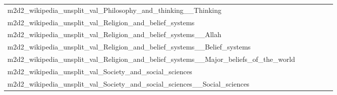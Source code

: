 {\begin{longtable}{m{6cm}m{1.7cm}m{1.7cm}m{1.7cm}m{1.7cm}m{1.7cm}}
	m2d2\_wikipedia\_unsplit\_val\_Philosophy\_and\_thinking\_\_Thinking  & \colorbox[HTML]{fefee2}{\makebox[\mywidth][c]{10.94}} & \colorbox[HTML]{edf8b2}{\makebox[\mywidth][c]{10.61}} & \colorbox[HTML]{ffffe5}{\makebox[\mywidth][c]{11.34}} & \colorbox[HTML]{ddf1a6}{\makebox[\mywidth][c]{10.56}} & \colorbox[HTML]{77c578}{\makebox[\mywidth][c]{10.42}}\\
	m2d2\_wikipedia\_unsplit\_val\_Religion\_and\_belief\_systems  & \colorbox[HTML]{fdfedf}{\makebox[\mywidth][c]{12.81}} & \colorbox[HTML]{f0f9b4}{\makebox[\mywidth][c]{12.45}} & \colorbox[HTML]{ffffe5}{\makebox[\mywidth][c]{13.44}} & \colorbox[HTML]{e0f2a8}{\makebox[\mywidth][c]{12.38}} & \colorbox[HTML]{77c578}{\makebox[\mywidth][c]{12.19}}\\
	m2d2\_wikipedia\_unsplit\_val\_Religion\_and\_belief\_systems\_\_Allah  & \colorbox[HTML]{fdfedf}{\makebox[\mywidth][c]{11.11}} & \colorbox[HTML]{eff8b3}{\makebox[\mywidth][c]{10.80}} & \colorbox[HTML]{ffffe5}{\makebox[\mywidth][c]{11.66}} & \colorbox[HTML]{d3eda0}{\makebox[\mywidth][c]{10.71}} & \colorbox[HTML]{77c578}{\makebox[\mywidth][c]{10.58}}\\
	m2d2\_wikipedia\_unsplit\_val\_Religion\_and\_belief\_systems\_\_Belief\_systems  & \colorbox[HTML]{fefee3}{\makebox[\mywidth][c]{11.46}} & \colorbox[HTML]{f1f9b4}{\makebox[\mywidth][c]{11.06}} & \colorbox[HTML]{ffffe5}{\makebox[\mywidth][c]{11.86}} & \colorbox[HTML]{c9e99b}{\makebox[\mywidth][c]{10.95}} & \colorbox[HTML]{77c578}{\makebox[\mywidth][c]{10.85}}\\
	m2d2\_wikipedia\_unsplit\_val\_Religion\_and\_belief\_systems\_\_Major\_beliefs\_of\_the\_world  & \colorbox[HTML]{fefee0}{\makebox[\mywidth][c]{12.38}} & \colorbox[HTML]{f0f9b4}{\makebox[\mywidth][c]{12.03}} & \colorbox[HTML]{ffffe5}{\makebox[\mywidth][c]{12.94}} & \colorbox[HTML]{cae99c}{\makebox[\mywidth][c]{11.91}} & \colorbox[HTML]{77c578}{\makebox[\mywidth][c]{11.79}}\\
	m2d2\_wikipedia\_unsplit\_val\_Society\_and\_social\_sciences  & \colorbox[HTML]{fdfedf}{\makebox[\mywidth][c]{10.53}} & \colorbox[HTML]{ecf7b1}{\makebox[\mywidth][c]{10.24}} & \colorbox[HTML]{ffffe5}{\makebox[\mywidth][c]{11.03}} & \colorbox[HTML]{d3eda0}{\makebox[\mywidth][c]{10.16}} & \colorbox[HTML]{77c578}{\makebox[\mywidth][c]{10.05}}\\
	m2d2\_wikipedia\_unsplit\_val\_Society\_and\_social\_sciences\_\_Social\_sciences  & \colorbox[HTML]{fdfede}{\makebox[\mywidth][c]{10.47}} & \colorbox[HTML]{d9f0a3}{\makebox[\mywidth][c]{10.16}} & \colorbox[HTML]{ffffe5}{\makebox[\mywidth][c]{10.95}} & \colorbox[HTML]{d0ec9e}{\makebox[\mywidth][c]{10.14}} & \colorbox[HTML]{77c578}{\makebox[\mywidth][c]{10.04}}\\

\end{longtable}}

